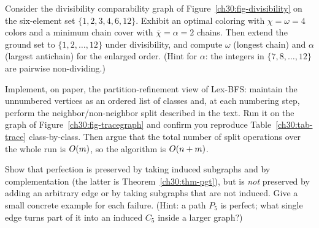 \begin{exercise}
Consider the divisibility comparability graph of Figure~\ref{ch30:fig-divisibility} on the six-element set $\{1,2,3,4,6,12\}$. Exhibit an optimal coloring with $\chi=\omega=4$ colors and a minimum chain cover with $\bar\chi=\alpha=2$ chains. Then extend the ground set to $\{1,2,\dots,12\}$ under divisibility, and compute $\omega$ (longest chain) and $\alpha$ (largest antichain) for the enlarged order. (Hint for $\alpha$: the integers in $\{7,8,\dots,12\}$ are pairwise non-dividing.)
\end{exercise}

\begin{exercise}
Implement, on paper, the partition-refinement view of Lex-BFS: maintain the unnumbered vertices as an ordered list of classes and, at each numbering step, perform the neighbor/non-neighbor split described in the text. Run it on the graph of Figure~\ref{ch30:fig-tracegraph} and confirm you reproduce Table~\ref{ch30:tab-trace} class-by-class. Then argue that the total number of split operations over the whole run is $O(m)$, so the algorithm is $O(n+m)$.
\end{exercise}

\begin{exercise}
Show that perfection is preserved by taking induced subgraphs and by complementation (the latter is Theorem~\ref{ch30:thm-pgt}), but is \emph{not} preserved by adding an arbitrary edge or by taking subgraphs that are not induced. Give a small concrete example for each failure. (Hint: a path $P_5$ is perfect; what single edge turns part of it into an induced $C_5$ inside a larger graph?)
\end{exercise}
